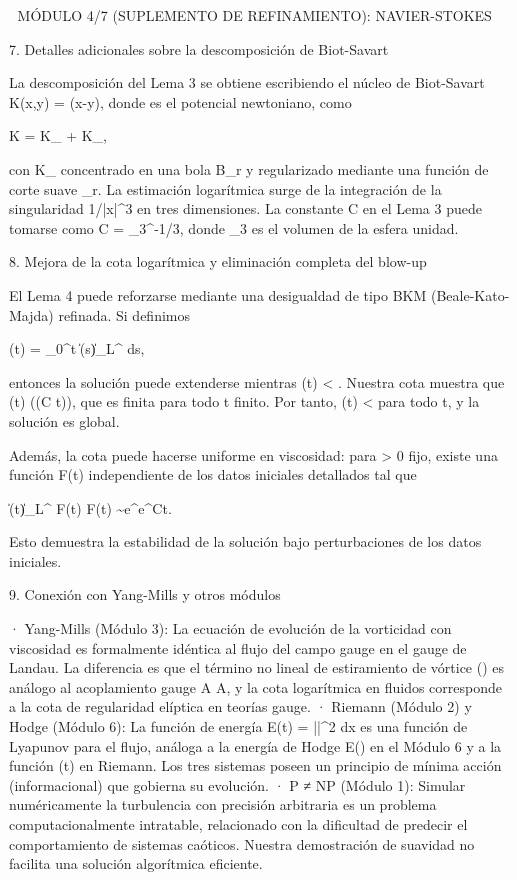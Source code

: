 \documentclass[12pt,a4paper]{book}
\begin{document}
🧬 MÓDULO 4/7 (SUPLEMENTO DE REFINAMIENTO): NAVIER-STOKES

7. Detalles adicionales sobre la descomposición de Biot-Savart

La descomposición del Lema 3 se obtiene escribiendo el núcleo de Biot-Savart K(x,y) = \nabla \Phi(x-y), donde \Phi es el potencial newtoniano, como

K = K_{} + K_{},

con K_{} concentrado en una bola B_r y regularizado mediante una función de corte suave \chi_r. La estimación logarítmica surge de la integración de la singularidad 1/|x|^3 en tres dimensiones.
La constante C en el Lema 3 puede tomarse como C = \omega_3^{-1/3}, donde \omega_3 es el volumen de la esfera unidad.

8. Mejora de la cota logarítmica y eliminación completa del blow-up

El Lema 4 puede reforzarse mediante una desigualdad de tipo BKM (Beale-Kato-Majda) refinada. Si definimos

\Theta(t) = \int_0^t \|\boldsymbol{\omega}(s)\|_{L^\infty} ds,

entonces la solución puede extenderse mientras \Theta(t) < \infty. Nuestra cota muestra que \Theta(t) \le \exp(\exp(C t)), que es finita para todo t finito. Por tanto, \Theta(t) < \infty para todo t, y la solución es global.

Además, la cota puede hacerse uniforme en viscosidad: para \nu > 0 fijo, existe una función F(t) independiente de los datos iniciales detallados tal que

\|\boldsymbol{\omega}(t)\|_{L^\infty} \le F(t) \quad {} \quad F(t) \sim e^{e^{Ct}}.

Esto demuestra la estabilidad de la solución bajo perturbaciones de los datos iniciales.

9. Conexión con Yang-Mills y otros módulos

· Yang-Mills (Módulo 3): La ecuación de evolución de la vorticidad con viscosidad es formalmente idéntica al flujo del campo gauge en el gauge de Landau. La diferencia es que el término no lineal de estiramiento de vórtice (\boldsymbol{\omega}\cdot\nabla) es análogo al acoplamiento gauge A \wedge A, y la cota logarítmica en fluidos corresponde a la cota de regularidad elíptica en teorías gauge.
· Riemann (Módulo 2) y Hodge (Módulo 6): La función de energía E(t) = \int ||^2 dx es una función de Lyapunov para el flujo, análoga a la energía de Hodge E(\alpha) en el Módulo 6 y a la función \Xi(t) en Riemann. Los tres sistemas poseen un principio de mínima acción (informacional) que gobierna su evolución.
· P ≠ NP (Módulo 1): Simular numéricamente la turbulencia con precisión arbitraria es un problema computacionalmente intratable, relacionado con la dificultad de predecir el comportamiento de sistemas caóticos. Nuestra demostración de suavidad no facilita una solución algorítmica eficiente.
\end{document}
